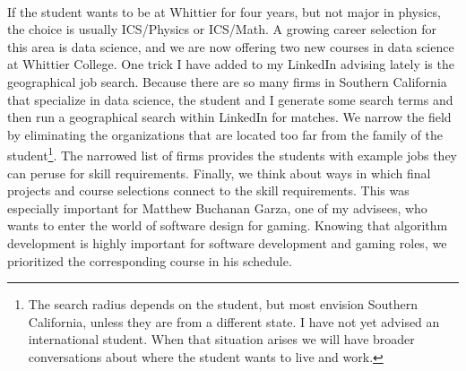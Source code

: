 \documentclass[../../../main.tex]{subfiles}
\begin{document}
\\
\vspace{0.25cm}
If the student wants to be at Whittier for four years, but not major in physics, the choice is usually ICS/Physics or ICS/Math.  A growing career selection for this area is data science, and we are now offering two new courses in data science at Whittier College.  One trick I have added to my LinkedIn advising lately is the geographical job search.  Because there are so many firms in Southern California that specialize in data science, the student and I generate some search terms and then run a geographical search within LinkedIn for matches.  We narrow the field by eliminating the organizations that are located too far from the family of the student\footnote{The search radius depends on the student, but most envision Southern California, unless they are from a different state.  I have not yet advised an international student.  When that situation arises we will have broader conversations about where the student wants to live and work.}.  The narrowed list of firms provides the students with example jobs they can peruse for skill requirements.  Finally, we think about ways in which final projects and course selections connect to the skill requirements.  This was especially important for Matthew Buchanan Garza, one of my advisees, who wants to enter the world of software design for gaming.  Knowing that algorithm development is highly important for software development and gaming roles, we prioritized the corresponding course in his schedule.
\end{document}
